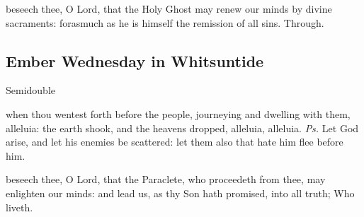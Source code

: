 

\vspace{-0.25\baselineskip}

\postcommunion
{} beseech thee, O Lord, that the Holy Ghost may renew our minds by divine sacraments: forasmuch as he is himself the remission of all sins. Through.


\subsection{Ember Wednesday in Whitsuntide}
\begin{inhead}
    {Semidouble}
\end{inhead}

\vspace{-0.25\baselineskip}

\introit
{} when thou wentest forth before the people, journeying and dwelling with them, alleluia: the earth shook, and the heavens dropped, alleluia, alleluia. \textit{Ps.} Let God arise, and let his enemies be scattered: let them also that hate him flee before him.

\vspace{-0.25\baselineskip}

\collect
{} beseech thee, O Lord, that the Paraclete, who proceedeth from thee, may enlighten our minds: and lead us, as thy Son hath promised, into all truth; Who liveth.

